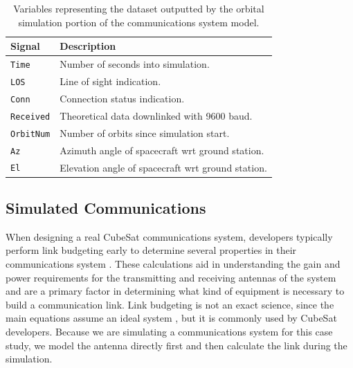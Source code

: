 \documentclass[conf]{new-aiaa}
\begin{document}
\begin{table}[!h]
\centering
\begin{tabular}{ll} 
\hline\hline
\textbf{Signal} & \textbf{Description}                               \\ 
\hline
\texttt{Time}            & Number of seconds into simulation.                 \\
\texttt{LOS}             & Line of sight indication.                          \\
\texttt{Conn}            & Connection status indication.                      \\
\texttt{Received}        & Theoretical data downlinked with 9600 baud.        \\
\texttt{OrbitNum}        & Number of orbits since simulation start.           \\
\texttt{Az}              & Azimuth angle of spacecraft wrt ground station.    \\
\texttt{El}              & Elevation angle of spacecraft wrt ground station.  \\
\hline\hline
\end{tabular}
\caption{Variables representing the dataset outputted by the orbital simulation portion of the communications system model.}
\label{GroundStationVariables}
\end{table}

\subsection{Simulated Communications}
\label{ref:comm}

When designing a real CubeSat communications system, developers typically perform link budgeting early to determine several properties in their communications system \cite{daylee2018}. These calculations aid in understanding the gain and power requirements for the transmitting and receiving antennas of the system and are a primary factor in determining what kind of equipment is necessary to build a communication link. Link budgeting is not an exact science, since the main equations assume an ideal system \cite{Zyren1998}, but it is commonly used by CubeSat developers. Because we are simulating a communications system for this case study, we model the antenna directly first and then calculate the link during the simulation.
\end{document}

